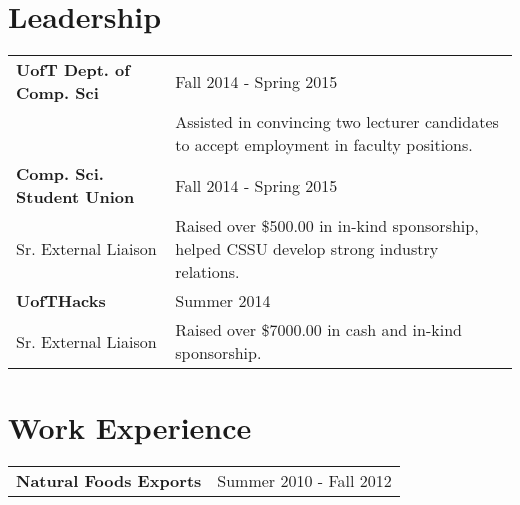 \section*{Leadership}
\begin{tabular}{P{4.5cm}|p{10.5cm}}
\textbf{UofT Dept. of Comp. Sci} & Fall 2014 - Spring 2015\\
 & Assisted in convincing two lecturer candidates to accept employment in faculty positions.\\
\hline
\textbf{Comp. Sci. Student Union} & Fall 2014 - Spring 2015\\
Sr. External Liaison & Raised over \$500.00 in in-kind sponsorship, helped CSSU develop strong industry relations. \\
\hline
\textbf{UofTHacks} & Summer 2014\\
Sr. External Liaison & Raised over \$7000.00 in cash and in-kind sponsorship.\\
\end{tabular}

\section*{Work Experience}
\begin{tabular}{P{4.5cm}|p{10.5cm}}
\textbf{Natural Foods Exports} & Summer 2010 - Fall 2012\\
\end{tabular}



